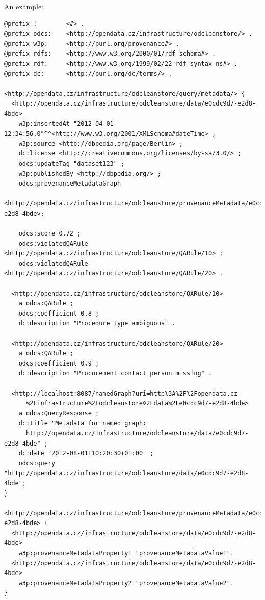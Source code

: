 \pagebreak[3]

An example:

\begin{lstlisting}[caption={Example of metadata query response in TriG},label=lst:metadataTrigResponse]
@prefix :        <#> .
@prefix odcs:    <http://opendata.cz/infrastructure/odcleanstore/> .
@prefix w3p:     <http://purl.org/provenance#> .
@prefix rdfs:    <http://www.w3.org/2000/01/rdf-schema#> .
@prefix rdf:     <http://www.w3.org/1999/02/22-rdf-syntax-ns#> .
@prefix dc:      <http://purl.org/dc/terms/> .

<http://opendata.cz/infrastructure/odcleanstore/query/metadata/> {
  <http://opendata.cz/infrastructure/odcleanstore/data/e0cdc9d7-e2d8-4bde>
    w3p:insertedAt "2012-04-01 12:34:56.0"^^<http://www.w3.org/2001/XMLSchema#dateTime> ;
    w3p:source <http://dbpedia.org/page/Berlin> ;
    dc:license <http://creativecommons.org/licenses/by-sa/3.0/> ;
    odcs:updateTag "dataset123" ;
    w3p:publishedBy <http://dbpedia.org/> ;
    odcs:provenanceMetadataGraph
      <http://opendata.cz/infrastructure/odcleanstore/provenanceMetadata/e0cdc9d7-e2d8-4bde>;
        
    odcs:score 0.72 ;
    odcs:violatedQARule <http://opendata.cz/infrastructure/odcleanstore/QARule/10> ;
    odcs:violatedQARule <http://opendata.cz/infrastructure/odcleanstore/QARule/20> .  

  <http://opendata.cz/infrastructure/odcleanstore/QARule/10>
    a odcs:QARule ;
    odcs:coefficient 0.8 ;
    dc:description "Procedure type ambiguous" .
        
  <http://opendata.cz/infrastructure/odcleanstore/QARule/20>
    a odcs:QARule ;
    odcs:coefficient 0.9 ;
    dc:description "Procurement contact person missing" .
        
  <http://localhost:8087/namedGraph?uri=http%3A%2F%2Fopendata.cz
      %2Finfrastructure%2Fodcleanstore%2Fdata%2Fe0cdc9d7-e2d8-4bde>
    a odcs:QueryResponse ;
    dc:title "Metadata for named graph:
      http://opendata.cz/infrastructure/odcleanstore/data/e0cdc9d7-e2d8-4bde" ;
    dc:date "2012-08-01T10:20:30+01:00" ;
    odcs:query "http://opendata.cz/infrastructure/odcleanstore/data/e0cdc9d7-e2d8-4bde";
}
    
<http://opendata.cz/infrastructure/odcleanstore/provenanceMetadata/e0cdc9d7-e2d8-4bde> {
  <http://opendata.cz/infrastructure/odcleanstore/data/e0cdc9d7-e2d8-4bde>
    w3p:provenanceMetadataProperty1 "provenanceMetadataValue1".
  <http://opendata.cz/infrastructure/odcleanstore/data/e0cdc9d7-e2d8-4bde>
    w3p:provenanceMetadataProperty2 "provenanceMetadataValue2".
}
\end{lstlisting}

